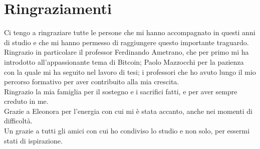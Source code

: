 \chapter{Ringraziamenti}
\label{chpr:ringraziamenti}


Ci tengo a ringraziare tutte le persone che mi hanno accompagnato in questi anni di studio e che mi hanno permesso di raggiungere questo importante traguardo.\\

\noindent
Ringrazio in particolare il professor Ferdinando Ametrano, che per primo mi ha introdotto all'appassionante tema di Bitcoin; Paolo Mazzocchi per la pazienza con la quale mi ha seguito nel lavoro di tesi; i professori che ho avuto lungo il mio percorso formativo per aver contribuito alla mia crescita.\\

\noindent
Ringrazio la mia famiglia per il sostegno e i sacrifici fatti, e per aver sempre creduto in me.\\

\noindent
Grazie a Eleonora per l'energia con cui mi è stata accanto, anche nei momenti di difficoltà.\\

\noindent
Un grazie a tutti gli amici con cui ho condiviso lo studio e non solo, per essermi stati di ispirazione.

